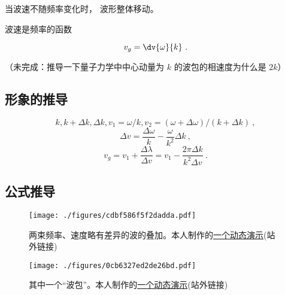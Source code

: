 
\begin{issues}
\issueDraft
\end{issues}


当波速不随频率变化时， 波形整体移动。

波速是频率的函数

\begin{equation}
v_g = \dv{\omega}{k}~.
\end{equation}

（未完成：推导一下量子力学中中心动量为 $k$ 的波包的相速度为什么是 $2k$）

\subsection{形象的推导}
\begin{equation}
k, k+\Delta k, \Delta k, v_1 = \omega/k, v_2 = (\omega+\Delta\omega)/(k+\Delta k)~,
\end{equation}
\begin{equation}
\Delta v = \frac{\Delta \omega}{k} - \frac{\omega}{k^2}\Delta k~,
\end{equation}
\begin{equation}
v_g = v_1 + \frac{\Delta \lambda}{\Delta v} = v_1 - \frac{2\pi\Delta k}{k^2\Delta v}~.
\end{equation}

\subsection{公式推导}
\begin{figure}[ht]
\centering
\texttt{[image: ./figures/cdbf586f5f2dadda.pdf]}
\caption{两束频率、速度略有差异的波的叠加。本人制作的\href{https://www.geogebra.org/m/vnjwxmqk}{一个动态演示}(站外链接)} \label{fig_GroupV_1}
\end{figure}

\begin{figure}[ht]
\centering
\texttt{[image: ./figures/0cb6327ed2de26bd.pdf]}
\caption{其中一个“波包”。本人制作的\href{https://www.geogebra.org/m/xb6uqd7x}{一个动态演示}(站外链接)} \label{fig_GroupV_2}
\end{figure}

